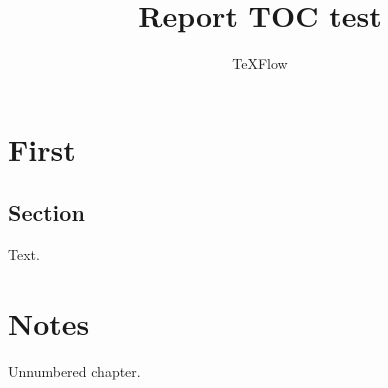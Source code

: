 \documentclass{report}
\title{Report TOC test}
\author{TeXFlow}
\begin{document}
\maketitle
\tableofcontents
\chapter{First}
\section{Section}
Text.
\chapter*{Notes}
Unnumbered chapter.
\end{document}
